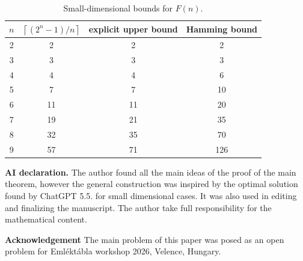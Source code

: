 \documentclass[11pt]{article}
\newcommand{\1}{\mathbf{1}}
\begin{document}
	\begin{table}[ht]
		\centering
		\begin{tabular}{@{}cccc@{}}
			\toprule
			$n$ & $\left\lceil(2^n-1)/n\right\rceil$ & explicit upper bound & Hamming bound\\
			\midrule
			2& 2&2&2\\
			3&3&3&3\\
			4&4&4&6\\
			5&7&7&10\\
			
			6 & 11 & 11 & 20\\
			7 & 19 & 21 & 35\\
			8 & 32 & 35 & 70\\
			9 & 57 & 71 & 126\\
			\bottomrule
		\end{tabular}
		\caption{Small-dimensional bounds for $F(n)$.}
	\end{table}
	
	\noindent \textbf{AI declaration.} The author found all the main ideas of the proof of the main theorem, however the general construction was inspired by the optimal solution found by ChatGPT 5.5. for small dimensional cases. It was also used in editing and finalizing the manuscript. The author  take full responsibility for the mathematical content.
	
	\noindent \textbf{Acknowledgement} The main problem of this paper was posed as an open problem for Emléktábla workshop 2026, Velence, Hungary. 
	
\end{document}
